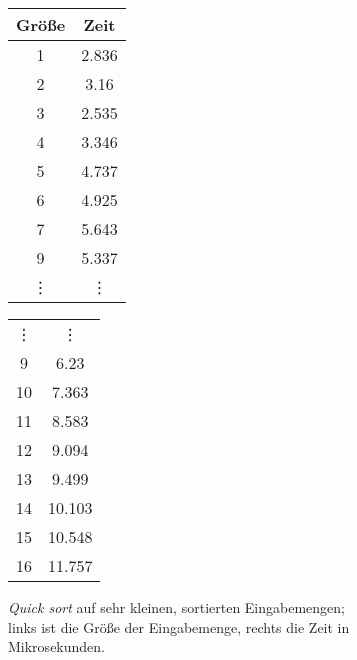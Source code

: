 \begin{figure}[ht]
    \begin{subfigure}[c]{0.49\textwidth}
        \begin{minipage}[t]{0.49\textwidth}
            \centering
            \begin{tabular}{c c}
                \toprule
                Größe & Zeit \\
                \midrule
                1 & 2.836\\
                2 & 3.16\\
                3 & 2.535\\
                4 & 3.346\\
                5 & 4.737\\
                6 & 4.925\\
                7 & 5.643\\
                9 & 5.337\\
                \vdots & \vdots \\
            \end{tabular}
        \end{minipage}
        \hfill
        \begin{minipage}[c]{0.49\textwidth}
            \begin{tabular}{c c}
                \vdots & \vdots \\
                9 & 6.23\\
                10& 7.363\\
                11& 8.583\\
                12& 9.094\\
                13& 9.499\\
                14& 10.103\\
                15& 10.548\\
                16& 11.757\\
                \bottomrule
            \end{tabular}
        \end{minipage}
        \caption{
            \emph{Quick sort} auf sehr kleinen, sortierten Eingabemengen; links ist die Größe der Eingabemenge, rechts die Zeit in Mikrosekunden.\label{fig:funkterm-beispieldaten}
        }
    \end{subfigure}
    \hfill
    \begin{subfigure}[c]{0.49\textwidth}
        \begin{tikzpicture}

\end{tikzpicture}
\end{subfigure}
\end{figure}
